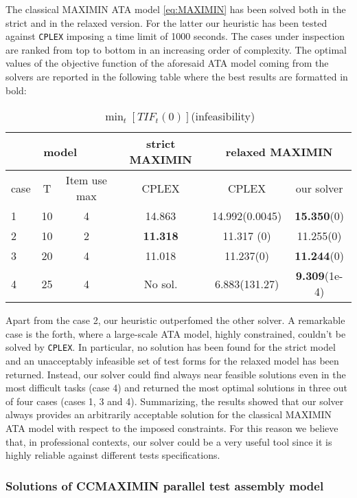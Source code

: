 The classical MAXIMIN ATA model \eqref{eq:MAXIMIN} has been solved both in the strict and in the relaxed version. For the latter our heuristic has been tested against \texttt{CPLEX} imposing a time limit of 1000 seconds. The cases under inspection are ranked from top to bottom in an increasing order of complexity. The optimal values of the objective function of the aforesaid ATA model coming from the solvers are reported in the following table where the best results are formatted in bold:
\begin{table}[H]
	\centering
	\caption{ $\min_t\left[TIF_t(0)\right]$(infeasibility)}
	\begin{tabular}{l cc c cc}
		\toprule
		\multicolumn{3}{c}{model} & strict MAXIMIN & \multicolumn{2}{c}{relaxed MAXIMIN} \\		
		\midrule
		case & T & Item use max &CPLEX & CPLEX & our solver  \\
		\hline
		1 & 10 & 4& 14.863 & 14.992(0.0045) & \textbf{15.350}(0) \\
		2& 10 & 2& \textbf{11.318} & 11.317 (0) & 11.255(0) \\
		3& 20 & 4& 11.018 & 11.237(0) & \textbf{11.244}(0)  \\
		4&25 & 4&  No sol. & 6.883(131.27) & \textbf{9.309}(1e-4)\\
		\bottomrule
	\end{tabular}
\end{table}
Apart from the case 2, our heuristic outperfomed the other solver. A remarkable case is the forth, where a large-scale ATA model, highly constrained, couldn't be solved by 	\texttt{CPLEX}. In particular, no solution has been found for the strict model and an unacceptably infeasible set of test forms for the relaxed model has been returned. Instead, our solver could find always near feasible solutions even in the most difficult tasks (case 4) and returned the most optimal solutions in three out of four cases (cases 1, 3 and 4).
Summarizing, the results showed that our solver always provides an arbitrarily acceptable solution for the classical MAXIMIN ATA model with respect to the imposed constraints. 
For this reason we believe that, in professional contexts, our solver could be a very useful tool since it is highly reliable against different tests specifications.

\subsubsection{Solutions of CCMAXIMIN parallel test assembly model} \label{sec:ccmmsol}

